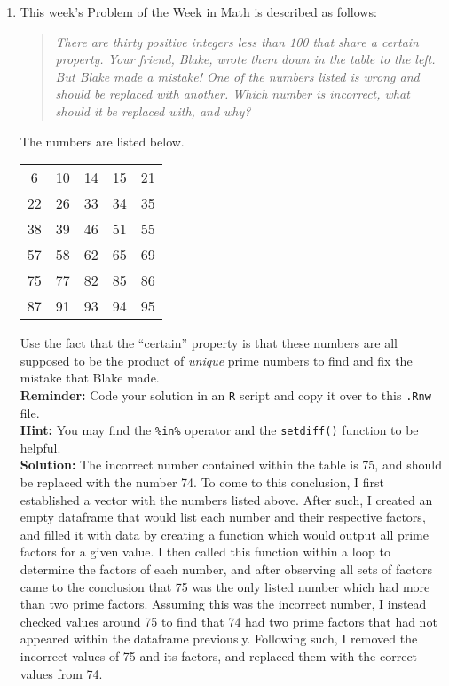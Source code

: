 \documentclass{article}\usepackage[]{graphicx}\usepackage[]{xcolor}
\begin{document}
\begin{enumerate}
\item This week's Problem of the Week in Math is described as follows:
\begin{quotation}
  \textit{There are thirty positive integers less than 100 that share a certain 
  property. Your friend, Blake, wrote them down in the table to the left. But 
  Blake made a mistake! One of the numbers listed is wrong and should be replaced 
  with another. Which number is incorrect, what should it be replaced with, and 
  why?}
\end{quotation}
The numbers are listed below.
\begin{center}
  \begin{tabular}{ccccc}
    6 & 10 & 14 & 15 & 21\\
    22 & 26 & 33 & 34 & 35\\
    38 & 39 & 46 & 51 & 55\\
    57 & 58 & 62 & 65 & 69\\
    75 & 77 & 82 & 85 & 86\\
    87 & 91 & 93 & 94 & 95
  \end{tabular}
\end{center}
Use the fact that the ``certain'' property is that these numbers are all supposed
to be the product of \emph{unique} prime numbers to find and fix the mistake that
Blake made.\\
\textbf{Reminder:} Code your solution in an \texttt{R} script and copy it over
to this \texttt{.Rnw} file.\\
\textbf{Hint:} You may find the \verb|%in%| operator and the \verb|setdiff()| function to be helpful.\\

\textbf{Solution:} The incorrect number contained within the table is 75, and should be replaced with the number 74. To come to this conclusion, I first established a vector with the numbers listed above. After such, I created an empty dataframe that would list each number and their respective factors, and filled it with data by creating a function which would output all prime factors for a given value. I then called this function within a loop to determine the factors of each number, and after observing all sets of factors came to the conclusion that 75 was the only listed number which had more than two prime factors. Assuming this was the incorrect number, I instead checked values around 75 to find that 74 had two prime factors that had not appeared within the dataframe previously. Following such, I removed the incorrect values of 75 and its factors, and replaced them with the correct values from 74.



\end{enumerate}
\end{document}
